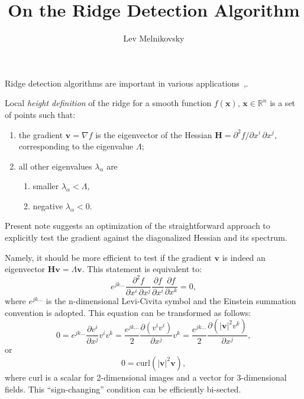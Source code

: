 \documentclass{article}
\author{Lev Melnikovsky}
\title{On the Ridge Detection Algorithm}
\newcommand{\pd}[2]{\ensuremath{\frac{\partial #1}{\partial #2}}}
\begin{document}
\maketitle

Ridge detection algorithms are important in various applications~\cite{ridges94},\cite{ridges96}.

Local \textit{height definition} of the ridge for a smooth function $f(\mathbf{x})$, $\mathbf{x} \in \mathbb{R}^n$ is a set of points such that:
\begin{enumerate}
\item the gradient $\mathbf{v} = \nabla f$ is the eigenvector of the Hessian $\boldsymbol{H} = \partial^2 \! f/\partial x^i\, \partial x^j$, corresponding to the eigenvalue $\Lambda$;
\item all other eigenvalues $\lambda_\alpha$ are 
\begin{enumerate}
\item smaller $\lambda_\alpha < \Lambda$,
\item negative $\lambda_\alpha <0$.
\end{enumerate} 
\end{enumerate}

Present note suggests an optimization of the straightforward approach to explicitly test the gradient against the diagonalized Hessian and its spectrum.

Namely, it should be more efficient to test if the gradient $\mathbf{v}$ is indeed an eigenvector $\boldsymbol{H} \mathbf{v} = \Lambda\mathbf{v}$. This statement is equivalent to:
\begin{equation}
e^{j k \dots}
\frac{\partial^2 \! f}{\partial x^i\, \partial x^j}
\pd{f}{x^i}\pd{f}{x^k}
=0,
\end{equation}
where $e^{j k \dots}$ is the n-dimensional Levi-Civita symbol and the Einstein summation convention is adopted. This equation can be transformed as follows:
\begin{equation}
0=
e^{j k \dots}
\pd{v^i}{x^j} v^i v^k=
\frac{e^{j k \dots}}{2}
\pd{(v^i v^i)}{x^j}  v^k=
\frac{e^{j k \dots}}{2}
\pd{(\left|\mathbf{v}\right|^2 v^k)}{x^j},
\end{equation}
or
\begin{equation}
\label{curl}
0=
\mathrm{curl} \left(\left|\mathbf{v}\right|^2 \mathbf{v}\right),
\end{equation}
where $\mathrm{curl}$ is a scalar for 2-dimensional images and a vector for 3-dimensional fields. This ``sign-changing'' condition can be efficiently bi-sected.
\end{document}
